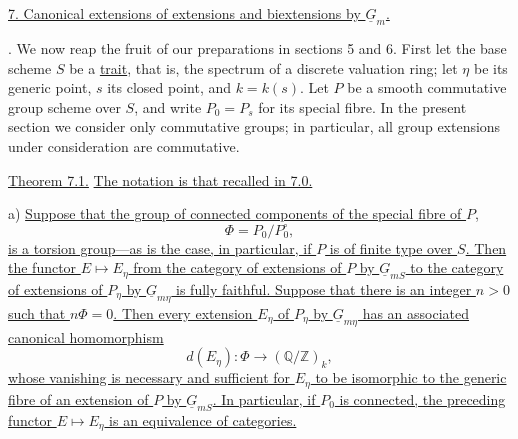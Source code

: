 
\medskip
\noindent\underline{7.  Canonical extensions of extensions and
biextensions by $\underline G_m$.}

\medskip
{}.  We now reap the fruit of our preparations in sections 5 and
6.  First let the base scheme $S$ be a \underline{trait}, that is, the
spectrum of a discrete valuation ring; let $\eta$ be its generic point,
$s$ its closed point, and $k=k(s)$.  Let $P$ be a smooth commutative group
scheme over $S$, and write $P_0=P_s$ for its special fibre.  In the present
section we consider only commutative groups; in particular, all group
extensions under consideration are commutative.

\medskip
\noindent\underline{Theorem 7.1.}  \underline{The notation is that recalled
in 7.0.}

\smallskip
\noindent a) \underline{Suppose that the group of connected components of
the special fibre of $P$,}
\[
 \Phi=P_0/P_0^{\circ},
\]
\underline{is a torsion group---as is the case, in particular, if $P$ is of
finite type over $S$.  Then the functor $E\mapsto E_\eta$ from the category
of extensions of $P$ by $\underline G_{mS}$ to the category of extensions
of $P_\eta$ by $\underline G_{m\eta}$ is fully faithful.  Suppose that there
is an integer $n>0$ such that $n\Phi=0$.  Then every extension $E_\eta$ of
$P_\eta$ by $\underline G_{m\eta}$ has an associated canonical
homomorphism}
\begin{equation}\tag{7.1.1}
 d(E_\eta):\Phi\longrightarrow(\mathbb Q/\mathbb Z)_k,
\end{equation}
\underline{whose vanishing is necessary and sufficient for $E_\eta$ to be
isomorphic to the generic fibre of an extension of $P$ by
$\underline G_{mS}$.  In particular, if $P_0$ is connected, the preceding
functor $E\mapsto E_\eta$ is an equivalence of categories.}

